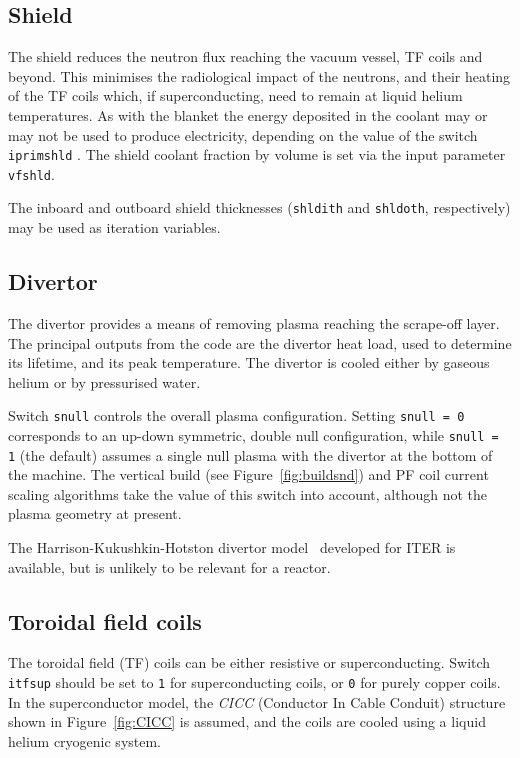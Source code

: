 \documentclass[11pt,a4paper]{report}
\begin{document}
\subsection{Shield}

The shield reduces the neutron flux reaching the vacuum vessel, TF coils and beyond. This minimises the radiological impact of the neutrons, and their heating of the TF coils which, if superconducting, need to remain at liquid helium temperatures. As with the blanket the energy deposited in the coolant may or may not be used to produce electricity, depending on the value of the switch \texttt{iprimshld} . The shield coolant fraction by volume is set via the input parameter \texttt{vfshld}.

The inboard and outboard shield thicknesses (\texttt{shldith} and
\texttt{shldoth}, respectively) may be used as iteration variables.

\subsection{Divertor}
\label{sec:divertor}

The divertor provides a means of removing plasma reaching the scrape-off layer. The principal outputs from the code are the divertor heat load, used to determine its lifetime, and its peak temperature. The divertor is cooled either by gaseous helium or by pressurised water.

Switch \texttt{snull} controls the overall plasma configuration. Setting
\texttt{snull = 0} corresponds to an up-down symmetric, double null
configuration, while \texttt{snull = 1} (the default) assumes a single null
plasma with the divertor at the bottom of the machine. The vertical build (see
Figure~\ref{fig:buildsnd}) and PF coil current scaling algorithms take the
value of this switch into account, although not the plasma geometry at
present.

The Harrison-Kukushkin-Hotston divertor model~\cite{IPDG} developed for ITER is available, but is unlikely to be relevant for a reactor.

\subsection{Toroidal field coils}
\label{sec:tfcoil}

The toroidal field (TF) coils can be either resistive or
superconducting. Switch \texttt{itfsup} should be set to \texttt{1} for
superconducting coils, or \texttt{0} for purely copper coils. In the
superconductor model, the \textit{CICC}\/ (Conductor In Cable Conduit)
structure shown in Figure~\ref{fig:CICC} is assumed, and the coils are cooled
using a liquid helium cryogenic system.
\end{document}
